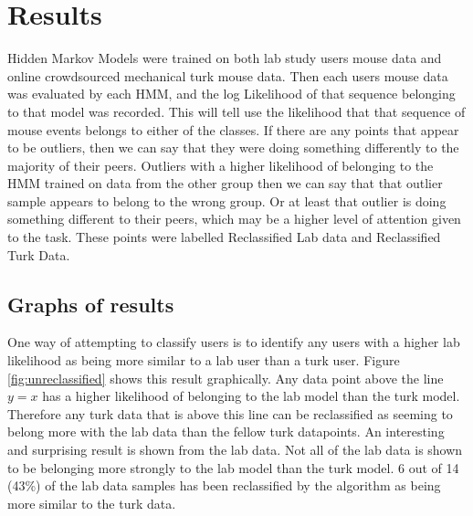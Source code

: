 \documentclass{article}
\begin{document}
\section{Results}

Hidden Markov Models were trained on both lab study users mouse data and online crowdsourced mechanical turk mouse data.
Then each users mouse data was evaluated by each HMM, and the log Likelihood of that sequence belonging to that model was recorded. 
This will tell use the likelihood that that sequence of mouse events belongs to either of the classes.
If there are any points that appear to be outliers, then we can say that they were doing something differently to the majority of their peers.
Outliers with a higher likelihood of belonging to the HMM trained on data from the other group then we can say that that outlier sample appears to belong to the wrong group.
Or at least that outlier is doing something different to their peers, which may be a higher level of attention given to the task. 
These points were labelled Reclassified Lab data and Reclassified Turk Data.

\subsection{Graphs of results}

One way of attempting to classify users is to identify any users with a higher lab likelihood as being more similar to a lab user than a turk user.
Figure \ref{fig:unreclassified} shows this result graphically.
Any data point above the line $y=x$ has a higher likelihood of belonging to the lab model than the turk model.
Therefore any turk data that is above this line can be reclassified as seeming to belong more with the lab data than the fellow turk datapoints. 
An interesting and surprising result is shown from the lab data.
Not all of the lab data is shown to be belonging more strongly to the lab model than the turk model.
6 out of 14 (43\%) of the lab data samples has been reclassified by the algorithm as being more similar to the turk data.
\end{document}
